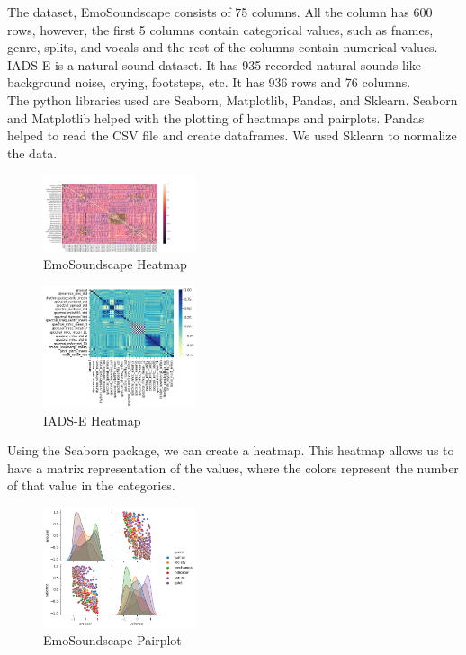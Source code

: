 \documentclass[conference]{IEEEtran}
\begin{document}
{\noindent
The dataset, EmoSoundscape consists of 75 columns. All the column has 600 rows, however, the first 5 columns contain categorical values, such as fnames, genre, splits, and vocals and the rest of the columns contain numerical values. IADS-E is a natural sound dataset. It has 935 recorded natural sounds like background noise, crying, footsteps, etc. It has 936 rows and 76 columns.\\

\noindent
The python libraries used are Seaborn, Matplotlib, Pandas, and Sklearn. Seaborn and Matplotlib helped with the plotting of heatmaps and pairplots. Pandas helped to read the CSV file and create dataframes. We used Sklearn to normalize the data.  


\begin{figure}[h]
\caption{EmoSoundscape Heatmap}
\centering
\includegraphics[width=0.4\textwidth]{Figures/Figure_1.png}
\end{figure}

\begin{figure}[h]
\caption{IADS-E Heatmap}
\centering
\includegraphics[width=0.4\textwidth]{Figures/iadheatmap.png}
\end{figure}

\FloatBarrier


\noindent
Using the Seaborn package, we can create a heatmap. This heatmap allows us to have a matrix representation of the values, where the colors represent the number of that value in the categories.

\begin{figure}[h]
\caption{EmoSoundscape Pairplot}
\centering
\includegraphics[width=0.4\textwidth]{Figures/Figure_2.png}
\end{figure}

}
\end{document}

